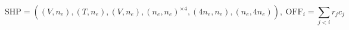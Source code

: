 \documentclass{article}
\begin{document}
\begin{preview}

\[ \mathrm{SHP} = ((V,n_e),(T,n_e),(V,n_e),(n_e,n_e)^{\times 4},(4n_e,n_e),(n_e,4n_e)),\ \mathrm{OFF}_i = \sum_{j<i} r_j c_j \]

\end{preview}
\end{document}

